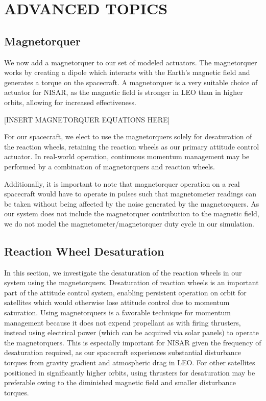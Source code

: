 \section{\Large ADVANCED TOPICS}
\subsection{Magnetorquer}
We now add a magnetorquer to our set of modeled actuators. The magnetorquer works by creating a dipole which interacts with the Earth's magnetic field and generates a torque on the spacecraft. A magnetorquer is a very suitable choice of actuator for NISAR, as the magnetic field is stronger in LEO than in higher orbits, allowing for increased effectiveness.

[INSERT MAGNETORQUER EQUATIONS HERE]

For our spacecraft, we elect to use the magnetorquers solely for desaturation of the reaction wheels, retaining the reaction wheels as our primary attitude control actuator. In real-world operation, continuous momentum management may be performed by a combination of magnetorquers and reaction wheels.

Additionally, it is important to note that magnetorquer operation on a real spacecraft would have to operate in pulses such that magnetometer readings can be taken without being affected by the noise generated by the magnetorquers. As our system does not include the magnetorquer contribution to the magnetic field, we do not model the magnetometer/magnetorquer duty cycle in our simulation.

\subsection{Reaction Wheel Desaturation}
In this section, we investigate the desaturation of the reaction wheels in our system using the magnetorquers. Desaturation of reaction wheels is an important part of the attitude control system, enabling persistent operation on orbit for satellites which would otherwise lose attitude control due to momentum saturation. Using magnetorquers is a favorable technique for momentum management because it does not expend propellant as with firing thrusters, instead using electrical power (which can be acquired via solar panels) to operate the magnetorquers. This is especially important for NISAR given the frequency of desaturation required, as our spacecraft experiences substantial disturbance torques from gravity gradient and atmospheric drag in LEO. For other satellites positioned in significantly higher orbits, using thrusters for desaturation may be preferable owing to the diminished magnetic field and smaller disturbance torques.

